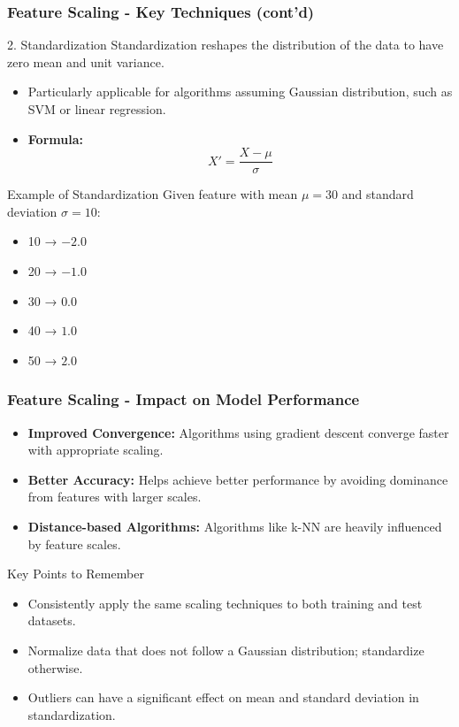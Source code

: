 \documentclass[aspectratio=169]{beamer}
\begin{document}
\begin{frame}[fragile]
    \frametitle{Feature Scaling - Key Techniques (cont'd)}
    \begin{block}{2. Standardization}
        Standardization reshapes the distribution of the data to have zero mean and unit variance.
        \begin{itemize}
            \item Particularly applicable for algorithms assuming Gaussian distribution, such as SVM or linear regression.
            \item \textbf{Formula:}
            \[
            X' = \frac{X - \mu}{\sigma}
            \]
        \end{itemize}
    \end{block}
    
    \begin{block}{Example of Standardization}
        Given feature with mean \(\mu = 30\) and standard deviation \(\sigma = 10\):
        \begin{itemize}
            \item 10 → \(-2.0\)
            \item 20 → \(-1.0\)
            \item 30 → \(0.0\)
            \item 40 → \(1.0\)
            \item 50 → \(2.0\)
        \end{itemize}
    \end{block}
\end{frame}

\begin{frame}[fragile]
    \frametitle{Feature Scaling - Impact on Model Performance}
    \begin{itemize}
        \item \textbf{Improved Convergence:} Algorithms using gradient descent converge faster with appropriate scaling.
        \item \textbf{Better Accuracy:} Helps achieve better performance by avoiding dominance from features with larger scales.
        \item \textbf{Distance-based Algorithms:} Algorithms like k-NN are heavily influenced by feature scales.
    \end{itemize}
    
    \begin{block}{Key Points to Remember}
        \begin{itemize}
            \item Consistently apply the same scaling techniques to both training and test datasets.
            \item Normalize data that does not follow a Gaussian distribution; standardize otherwise.
            \item Outliers can have a significant effect on mean and standard deviation in standardization.
        \end{itemize}
    \end{block}
\end{frame}
\end{document}
